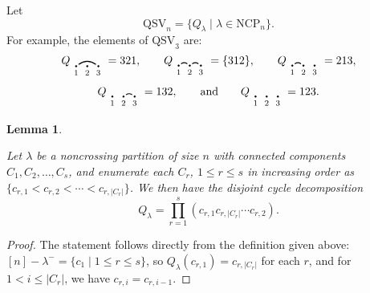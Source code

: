 \documentclass[12pt]{amsart}
\newtheorem{lem}[equation]{Lemma}
\theoremstyle{definition}
\theoremstyle{remark}
\numberwithin{equation}{section}
\renewcommand{\setminus}{-}
\newcommand{\QSV}{\mathrm{QSV}}
\newcommand{\NCP}{\mathrm{NCP}}
\begin{document}
Let
\[
\QSV_{n} = \{Q_{\lambda} \;|\; \lambda \in \NCP_{n} \}.
\]
For example, the elements of $\QSV_{3}$ are:
\[
Q_{\begin{tikzpicture}[scale = 0.35, baseline = 0.35*-0.2]
\foreach \x in {1, ..., 3}{\draw[fill] (\x - 1, 0) circle (2pt) node[inner sep = 2pt] (\x) {};}
\foreach \x in {1, ..., 3}{\node[below] at (\x) {$\scriptstyle \x$};}
\foreach \i\j in {1/3}{\draw[thick] (\i) to[out = 35, in = 145] (\j);}
\end{tikzpicture}} = 321, \qquad
Q_{\begin{tikzpicture}[scale = 0.35, baseline = 0.35*-0.2]
\foreach \x in {1, ..., 3}{\draw[fill] (\x - 1, 0) circle (2pt) node[inner sep = 2pt] (\x) {};}
\foreach \x in {1, ..., 3}{\node[below] at (\x) {$\scriptstyle \x$};}
\foreach \i\j in {1/2, 2/3}{\draw[thick] (\i) to[out = 35, in = 145] (\j);}
\end{tikzpicture}} = \{312\}, \qquad
Q_{\begin{tikzpicture}[scale = 0.35, baseline = 0.35*-0.2]
\foreach \x in {1, ..., 3}{\draw[fill] (\x - 1, 0) circle (2pt) node[inner sep = 2pt] (\x) {};}
\foreach \x in {1, ..., 3}{\node[below] at (\x) {$\scriptstyle \x$};}
\foreach \i\j in {1/2}{\draw[thick] (\i) to[out = 35, in = 145] (\j);}
\end{tikzpicture}} = 213, 
\]
\[
Q_{\begin{tikzpicture}[scale = 0.35, baseline = 0.35*-0.2]
\foreach \x in {1, ..., 3}{\draw[fill] (\x - 1, 0) circle (2pt) node[inner sep = 2pt] (\x) {};}
\foreach \x in {1, ..., 3}{\node[below] at (\x) {$\scriptstyle \x$};}
\foreach \i\j in {2/3}{\draw[thick] (\i) to[out = 35, in = 145] (\j);}
\end{tikzpicture}} = 132, \qquad\text{and}\qquad
Q_{\begin{tikzpicture}[scale = 0.35, baseline = 0.35*-0.2]
\foreach \x in {1, ..., 3}{\draw[fill] (\x - 1, 0) circle (2pt) node[inner sep = 2pt] (\x) {};}
\foreach \x in {1, ..., 3}{\node[below] at (\x) {$\scriptstyle \x$};}
\end{tikzpicture}} = 123.
\]

\begin{lem}
\label{lem:QSVcycles}

Let $\lambda$ be a noncrossing partition of size $n$ with connected components $C_{1}, C_{2}, \ldots, C_{s}$, and enumerate each $C_{r}$, $1 \le r \le s$ in increasing order as $\{c_{r, 1} < c_{r, 2} < \cdots < c_{r, |C_{r}|}\}$. 
We then have the disjoint cycle decomposition
\[
Q_{\lambda} = \prod_{r = 1}^{s} (c_{r, 1} c_{r, |C_{r}|} \cdots c_{r, 2}).
\]
\end{lem}
\begin{proof}
The statement follows directly from the definition given above: $[n] \setminus \lambda^{-} = \{c_1 \;|\; 1 \le r \le s\}$, so $Q_{\lambda}(c_{r, 1}) =  c_{r, |C_{r}|}$ for each $r$, and for $1 < i \le |C_{r}|$, we have $c_{r, i} = c_{r, i-1}$.
\end{proof}
\end{document}
